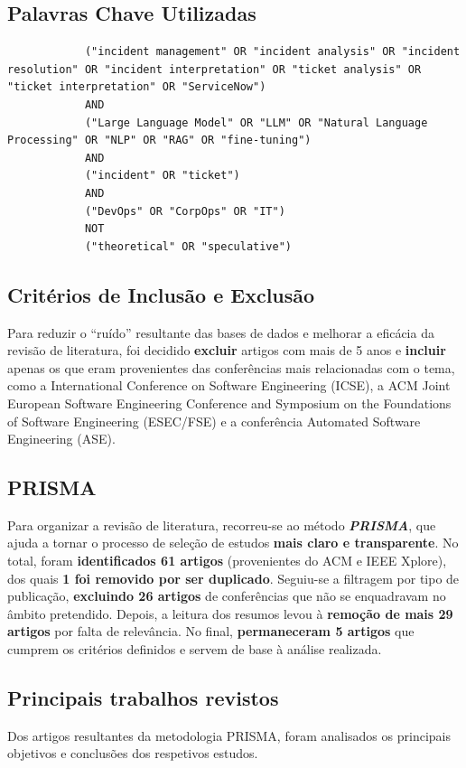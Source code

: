 	\subsection{Palavras Chave Utilizadas}
		\lstset{language=Java}
		\begin{lstlisting}
			("incident management" OR "incident analysis" OR "incident resolution" OR "incident interpretation" OR "ticket analysis" OR "ticket interpretation" OR "ServiceNow")
			AND
			("Large Language Model" OR "LLM" OR "Natural Language Processing" OR "NLP" OR "RAG" OR "fine-tuning")
			AND
			("incident" OR "ticket")
			AND
			("DevOps" OR "CorpOps" OR "IT")
			NOT
			("theoretical" OR "speculative")
		\end{lstlisting}
	
	\subsection{Critérios de Inclusão e Exclusão}
		Para reduzir o “ruído” resultante das bases de dados e melhorar a eficácia da revisão de literatura, foi decidido \textbf{excluir} artigos com mais de 5 anos e \textbf{incluir} apenas os que eram provenientes das conferências mais relacionadas com o tema, como a International Conference on Software Engineering (ICSE), a ACM Joint European Software Engineering Conference and Symposium on the Foundations of Software Engineering (ESEC/FSE) e a conferência Automated Software Engineering (ASE). 
		
	\subsection{PRISMA}
		Para organizar a revisão de literatura, recorreu-se ao método \textbf{\textit{PRISMA}}, que ajuda a tornar o processo de seleção de estudos \textbf{mais claro e transparente}. No total, foram \textbf{identificados 61 artigos} (provenientes do ACM e IEEE Xplore), dos quais \textbf{1 foi removido por ser duplicado}. Seguiu-se a filtragem por tipo de publicação, \textbf{excluindo 26 artigos} de conferências que não se enquadravam no âmbito pretendido. Depois, a leitura dos resumos levou à \textbf{remoção de mais 29 artigos }por falta de relevância. No final, \textbf{permaneceram 5 artigos} que cumprem os critérios definidos e servem de base à análise realizada.
		
	\subsection{Principais trabalhos revistos}
		Dos artigos resultantes da metodologia PRISMA, foram analisados os principais objetivos e conclusões dos respetivos estudos.
		
